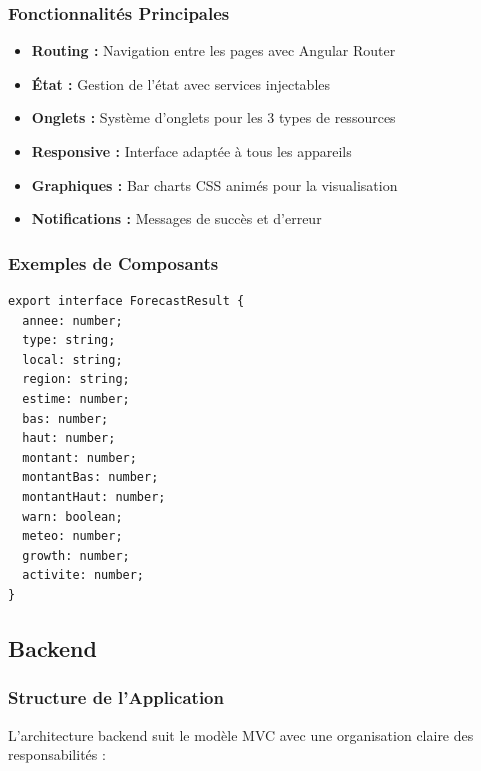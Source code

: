 \documentclass[12pt,a4paper]{article}
\begin{document}
\subsubsection{Fonctionnalités Principales}
\begin{itemize}
    \item \textbf{Routing :} Navigation entre les pages avec Angular Router
    \item \textbf{État :} Gestion de l'état avec services injectables
    \item \textbf{Onglets :} Système d'onglets pour les 3 types de ressources
    \item \textbf{Responsive :} Interface adaptée à tous les appareils
    \item \textbf{Graphiques :} Bar charts CSS animés pour la visualisation
    \item \textbf{Notifications :} Messages de succès et d'erreur
\end{itemize}

\subsubsection{Exemples de Composants}
\begin{lstlisting}[style=typescript, caption=Modèle ForecastResult]
export interface ForecastResult {
  annee: number;
  type: string;
  local: string;
  region: string;
  estime: number;
  bas: number;
  haut: number;
  montant: number;
  montantBas: number;
  montantHaut: number;
  warn: boolean;
  meteo: number;
  growth: number;
  activite: number;
}
\end{lstlisting}

\subsection{Backend}

\subsubsection{Structure de l'Application}
L'architecture backend suit le modèle MVC avec une organisation claire des responsabilités :
\end{document}
